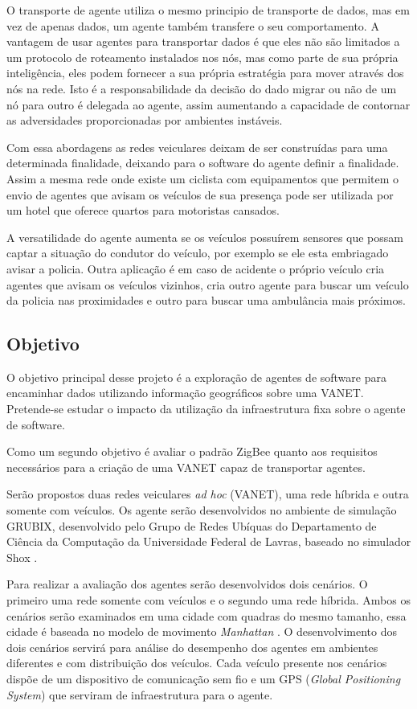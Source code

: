 O transporte de agente utiliza o mesmo principio de transporte de dados, mas em vez de apenas dados, um agente também transfere o seu comportamento. A vantagem de usar agentes para transportar dados é que eles não são limitados a um protocolo de roteamento instalados nos nós, mas como parte de sua própria inteligência, eles podem fornecer a sua própria estratégia para mover através dos nós na rede. Isto é a responsabilidade da decisão do dado migrar ou não de um nó para outro é delegada ao agente, assim aumentando a capacidade de contornar as adversidades proporcionadas por ambientes instáveis.

Com essa abordagens as redes veiculares deixam de ser construídas para uma determinada finalidade, deixando para o software do agente definir a finalidade. Assim a mesma rede onde existe um ciclista com equipamentos que permitem o envio de agentes que avisam os veículos de sua presença pode ser utilizada por um hotel que oferece quartos para motoristas cansados. 

A versatilidade do agente aumenta se os veículos possuírem sensores que possam captar a situação do condutor do veículo, por exemplo se ele esta embriagado avisar a policia. Outra aplicação é em caso de acidente o próprio veículo cria agentes que avisam os veículos vizinhos, cria outro agente para buscar um veículo da policia nas proximidades e outro para buscar uma ambulância mais próximos.   

\subsection{Objetivo}

O objetivo principal desse projeto é a exploração de agentes de software para encaminhar dados utilizando informação geográficos sobre uma VANET. Pretende-se estudar o impacto da utilização da infraestrutura fixa sobre o agente de software.

Como um segundo objetivo é avaliar o padrão ZigBee quanto aos requisitos necessários para a criação de uma VANET capaz de transportar agentes. 

Serão propostos duas redes veiculares \emph{ad hoc} (VANET), uma rede híbrida e outra somente com veículos. Os agente serão desenvolvidos no ambiente de simulação GRUBIX, desenvolvido pelo Grupo de Redes Ubíquas do Departamento de Ciência da Computação da Universidade Federal de Lavras, baseado no simulador Shox \cite{Lessmann:2008}.

Para realizar a avaliação dos agentes serão desenvolvidos dois cenários. O primeiro uma rede somente com veículos e o segundo uma rede híbrida. Ambos os cenários serão examinados em uma cidade com quadras do mesmo tamanho, essa cidade é baseada no modelo de movimento \emph{Manhattan} \cite{Bai:2003}. O desenvolvimento dos dois cenários servirá para análise do desempenho dos agentes em ambientes diferentes e com distribuição dos veículos. Cada veículo presente nos cenários dispõe de um dispositivo de comunicação sem fio e um GPS (\emph{Global Positioning System}) que serviram de infraestrutura para o agente. 

